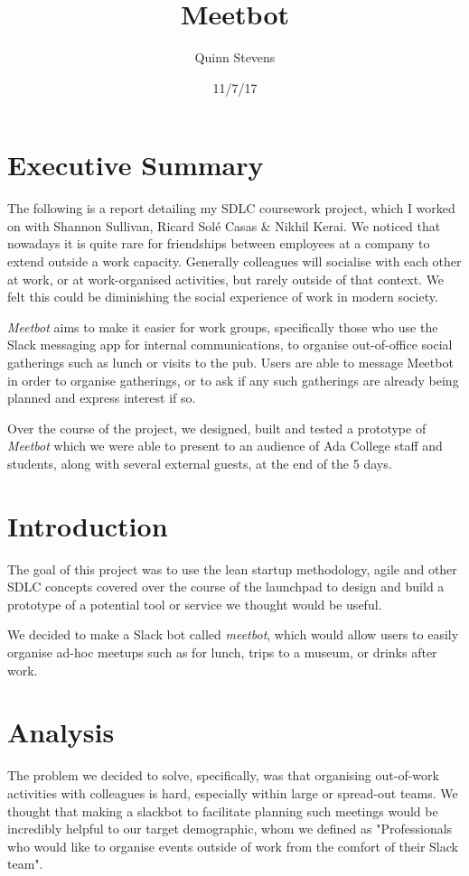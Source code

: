 \documentclass{report}
\author{Quinn Stevens}
\title{Meetbot}
\date{11/7/17}
\begin{document}
\maketitle
\section*{Executive Summary}
The following is a report detailing my SDLC coursework project, which I worked on with Shannon Sullivan, Ricard Sol\'e Casas \& Nikhil Kerai. We noticed that nowadays it is quite rare for friendships between employees at a company to extend outside a work capacity. Generally colleagues will socialise with each other at work, or at work-organised activities, but rarely outside of that context. We felt this could be diminishing the social experience of work in modern society.

\vspace{3mm}

\emph{Meetbot} aims to make it easier for work groups, specifically those who use the Slack messaging app for internal communications, to organise out-of-office social gatherings such as lunch or visits to the pub. Users are able to message Meetbot in order to organise gatherings, or to ask if any such gatherings are already being planned and express interest if so.

\vspace{3mm}

Over the course of the project, we designed, built and tested a prototype of \emph{Meetbot} which we were able to present to an audience of Ada College staff and students, along with several external guests, at the end of the 5 days.
\tableofcontents

\section{Introduction}
The goal of this project was to use the lean startup methodology, agile and other SDLC concepts covered over the course of the launchpad to design and build a prototype of a potential tool or service we thought would be useful.

We decided to make a Slack bot called \emph{meetbot}, which would allow users to easily organise ad-hoc meetups such as for lunch, trips to a museum, or drinks after work.

\section{Analysis}
The problem we decided to solve, specifically, was that organising out-of-work activities with colleagues is hard, especially within large or spread-out teams. We thought that making a slackbot to facilitate planning such meetings would be incredibly helpful to our target demographic, whom we defined as "Professionals who would like to organise events outside of work from the comfort of their Slack team".
\end{document}
